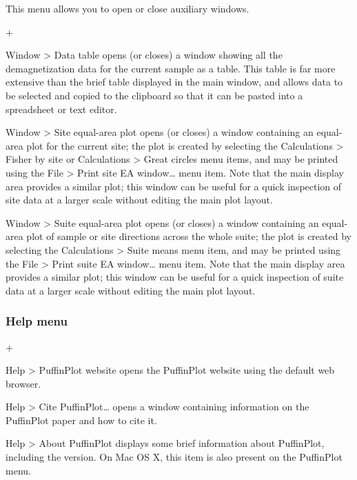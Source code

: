 \documentclass[a4paper,british]{article}
\newcommand{\menuitemlabel}[1]{%
\mbox{\textsf{#1}}\hfil}
\newenvironment{menuitemlist}%
{\begin{list}{}{%
\renewcommand{\makelabel}{\menuitemlabel}%
\setlength{\labelwidth}{35pt}%
\setlength{\leftmargin}%
             {\labelwidth+\labelsep}}}%
{\end{list}}
\newcommand{\ppcmd}[1]{\textsf{#1}} %
\newcommand{\submenu}{ \textgreater{} } %
\begin{document}
This menu allows you to open or close auxiliary windows.

\begin{menuitemlist}

\item[Window\submenu Data table] opens (or closes) a window showing
all the demagnetization data for the current sample as a table. This
table is far more extensive than the brief table displayed in the
main window, and allows data to be selected and copied to the clipboard
so that it can be pasted into a spreadsheet or text editor.

\item[Window\submenu Site equal-area plot] opens (or closes) a window
  containing an equal-area plot for the current site; the plot is created by
  selecting the \ppcmd{Calculations\submenu Fisher by site} or
  \ppcmd{Calculations\submenu Great circles} menu items, and may be printed
  using the \ppcmd{File\submenu Print site EA window\ldots} menu item. Note
  that the main display area provides a similar plot; this window can be
  useful for a quick inspection of site data at a larger scale without
  editing the main plot layout.

\item[Window\submenu Suite equal-area plot] opens (or closes) a window
  containing an equal-area plot of sample or site directions across the whole
  suite; the plot is created by selecting the \ppcmd{Calculations\submenu
    Suite means} menu item, and may be printed using the
  \ppcmd{File\submenu Print suite EA window\ldots} menu item. Note that the
  main display area provides a similar plot; this window can be useful for a
  quick inspection of suite data at a larger scale without editing the main
  plot layout.

\end{menuitemlist}

\subsubsection{Help menu}

\begin{menuitemlist}

\item[Help\submenu PuffinPlot website] opens the PuffinPlot website 
using the default web browser.

\item[Help\submenu Cite PuffinPlot\ldots] opens a window containing
information on the PuffinPlot paper \citep{lurcock2012puffinplot}
and how to cite it.

\item[Help\submenu About PuffinPlot] displays some brief information
about PuffinPlot, including the version. On Mac OS X, this item is
also present on the \ppcmd{PuffinPlot} menu.

\end{menuitemlist}
\end{document}
